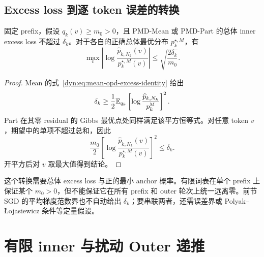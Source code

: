\subsection{Excess loss 到逐 token 误差的转换}

\begin{proposition}
固定 prefix，假设 $q_k(v)\geq m_0>0$，且 PMD-Mean 或 PMD-Part 的总体 inner excess loss 不超过 $\delta_k$。对于各自的正确总体最优分布 $p_k^{\star,M}$，有
\begin{equation*}
 \max_v\left|\log\frac{\widehat p_{k,N_k}(v)}{p_k^{\star,M}(v)}\right|
 \leq\sqrt{\frac{2\delta_k}{m_0}}.
\end{equation*}
\end{proposition}

\begin{proof}
Mean 的式~\eqref{dyn:eq:mean-opd-excess-identity} 给出
\begin{equation*}
 \delta_k\geq\frac12\mathbb E_{q_k}
 \left[\log\frac{\widehat p_{k,N_k}}{p_k^{\mathrm M}}\right]^2.
\end{equation*}
Part 在其零 residual 的 Gibbs 最优点处同样满足该平方恒等式。对任意 token $v$，期望中的单项不超过总和，因此
\begin{equation*}
 \frac{m_0}{2}
 \left[\log\frac{\widehat p_{k,N_k}(v)}{p_k^{\star,M}(v)}\right]^2
 \leq\delta_k.
\end{equation*}
开平方后对 $v$ 取最大值得到结论。
\end{proof}

这个转换需要总体 excess loss 与正的最小 anchor 概率。有限词表在单个 prefix 上保证某个 $m_0>0$，但不能保证它在所有 prefix 和 outer 轮次上统一远离零。前节 SGD 的平均梯度范数界也不自动给出 $\delta_k$；要串联两者，还需误差界或 Polyak--Łojasiewicz 条件等定量假设。

\section{有限 inner 与扰动 Outer 递推}

